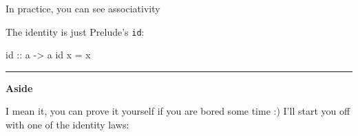 \documentclass[]{article}
\newenvironment{Shaded}{}{}
\newcommand{\DataTypeTok}[1]{\textcolor[rgb]{0.56,0.13,0.00}{#1}}
\newcommand{\DecValTok}[1]{\textcolor[rgb]{0.25,0.63,0.44}{#1}}
\newcommand{\FunctionTok}[1]{\textcolor[rgb]{0.02,0.16,0.49}{#1}}
\newcommand{\NormalTok}[1]{#1}
\newcommand{\OperatorTok}[1]{\textcolor[rgb]{0.40,0.40,0.40}{#1}}
\newcommand{\OtherTok}[1]{\textcolor[rgb]{0.00,0.44,0.13}{#1}}
\begin{document}
In practice, you can see associativity

\begin{Shaded}
\end{Shaded}

The identity is just Prelude's \texttt{id}:

\begin{Shaded}
\begin{Highlighting}[]
\FunctionTok{id}\OtherTok{ ::}\NormalTok{ a }\OtherTok{{-}\textgreater{}}\NormalTok{ a}
\FunctionTok{id}\NormalTok{ x }\OtherTok{=}\NormalTok{ x}
\end{Highlighting}
\end{Shaded}

\begin{Shaded}
\end{Shaded}

\begin{center}\rule{0.5\linewidth}{0.5pt}\end{center}

\textbf{Aside}

I mean it, you can prove it yourself if you are bored some time :) I'll start
you off with one of the identity laws:
\end{document}
